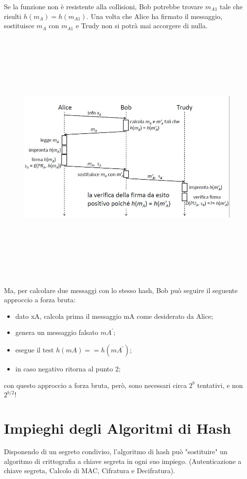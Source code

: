Se la funzione non è resistente alla collisioni, Bob potrebbe trovare $m_{A1}$ tale che risulti $h(m_{A})= h(m_{A1})$.
Una volta che Alice ha firmato il messaggio, sostituisce $m_{A}$ con $m_{A1}$ e Trudy non si potrà mai accorgere di nulla.
\begin{figure}
	\begin{center}
	{\includegraphics[height=13cm, width=13cm, keepaspectratio]{Immagini/Capitolo4/schema_hash_collisioni_1.JPG}}
	\end{center}
\end{figure}
Ma, per calcolare due messaggi con lo stesso hash, Bob può seguire il seguente approccio a forza bruta:
\begin{itemize}
\item dato xA, calcola prima il messaggio mA come desiderato da Alice;
\item genera un messaggio falsato $mA^{'}$;
\item esegue il test $h(mA)==h(mA^{'})$;
\item in caso negativo ritorna al punto 2;
\end{itemize}
con questo approccio a forza bruta, però, sono necessari circa $2^{b}$ tentativi, e non $2^{b/2}$!

\section{Impieghi degli Algoritmi di Hash}
Disponendo di un segreto condiviso, l'algoritmo di hash può "sostituire" un algoritmo di crittografia a chiave segreta in ogni suo impiego. (Autenticazione a chiave segreta, Calcolo di MAC, Cifratura e Decifratura).
